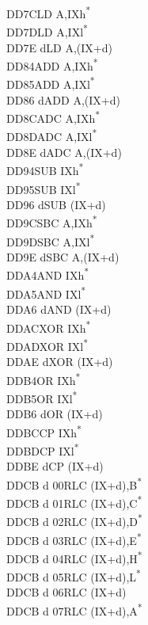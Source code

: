 \documentclass[twoside,openright,a4paper]{book}
\begin{document}
\begin{multicols}{3}
{\begin{tabbing}
	DD7C\>LD A,IXh\textsuperscript{*}\\
	DD7D\>LD A,IXl\textsuperscript{*}\\
	DD7E d\>LD A,(IX+d)\\
	DD84\>ADD A,IXh\textsuperscript{*}\\
	DD85\>ADD A,IXl\textsuperscript{*}\\
	DD86 d\>ADD A,(IX+d)\\
	DD8C\>ADC A,IXh\textsuperscript{*}\\
	DD8D\>ADC A,IXl\textsuperscript{*}\\
	DD8E d\>ADC A,(IX+d)\\
	DD94\>SUB IXh\textsuperscript{*}\\
	DD95\>SUB IXl\textsuperscript{*}\\
	DD96 d\>SUB (IX+d)\\
	DD9C\>SBC A,IXh\textsuperscript{*}\\
	DD9D\>SBC A,IXl\textsuperscript{*}\\
	DD9E d\>SBC A,(IX+d)\\
	DDA4\>AND IXh\textsuperscript{*}\\
	DDA5\>AND IXl\textsuperscript{*}\\
	DDA6 d\>AND (IX+d)\\
	DDAC\>XOR IXh\textsuperscript{*}\\
	DDAD\>XOR IXl\textsuperscript{*}\\
	DDAE d\>XOR (IX+d)\\
	DDB4\>OR IXh\textsuperscript{*}\\
	DDB5\>OR IXl\textsuperscript{*}\\
	DDB6 d\>OR (IX+d)\\
	DDBC\>CP IXh\textsuperscript{*}\\
	DDBD\>CP IXl\textsuperscript{*}\\
	DDBE d\>CP (IX+d)\\
	DDCB d 00\>RLC (IX+d),B\textsuperscript{*}\\
	DDCB d 01\>RLC (IX+d),C\textsuperscript{*}\\
	DDCB d 02\>RLC (IX+d),D\textsuperscript{*}\\
	DDCB d 03\>RLC (IX+d),E\textsuperscript{*}\\
	DDCB d 04\>RLC (IX+d),H\textsuperscript{*}\\
	DDCB d 05\>RLC (IX+d),L\textsuperscript{*}\\
	DDCB d 06\>RLC (IX+d)\\
	DDCB d 07\>RLC (IX+d),A\textsuperscript{*}\\

\end{tabbing}}
\end{multicols}
\end{document}
